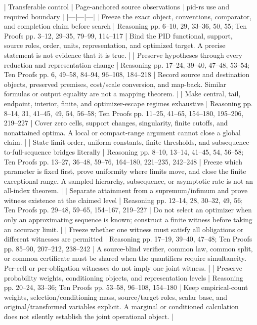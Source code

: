 \documentclass[11pt]{article}
\begin{document}
\begin{markdown}
| Transferable control | Page-anchored source observations | pid-rs use and required boundary |
|---|---|---|
| Freeze the exact object, conventions, comparator, and completion claim before search | Reasoning pp. 6--10, 29, 33--36, 50, 55; Ten Proofs pp. 3--12, 29--35, 79--99, 114--117 | Bind the PID functional, support, source roles, order, units, representation, and optimized target. A precise statement is not evidence that it is true. |
| Preserve hypotheses through every reduction and representation change | Reasoning pp. 17--24, 39--40, 47--48, 53--54; Ten Proofs pp. 6, 49--58, 84--94, 96--108, 184--218 | Record source and destination objects, preserved premises, cost/scale conversion, and map-back. Similar formulas or output equality are not a mapping theorem. |
| Make central, tail, endpoint, interior, finite, and optimizer-escape regimes exhaustive | Reasoning pp. 8--14, 31, 41--45, 49, 54, 56--58; Ten Proofs pp. 11--25, 41--65, 154--180, 195--206, 219--227 | Cover zero cells, support changes, singularity, finite cutoffs, and nonattained optima. A local or compact-range argument cannot close a global claim. |
| State limit order, uniform constants, finite thresholds, and subsequence-to-full-sequence bridges literally | Reasoning pp. 8--10, 13--14, 41--45, 54, 56--58; Ten Proofs pp. 13--27, 36--48, 59--76, 164--180, 221--235, 242--248 | Freeze which parameter is fixed first, prove uniformity where limits move, and close the finite exceptional range. A sampled hierarchy, subsequence, or asymptotic rate is not an all-index theorem. |
| Separate attainment from a supremum/infimum and prove witness existence at the claimed level | Reasoning pp. 12--14, 28, 30--32, 49, 56; Ten Proofs pp. 29--48, 59--65, 154--167, 219--227 | Do not select an optimizer when only an approximating sequence is known; construct a finite witness before taking an accuracy limit. |
| Freeze whether one witness must satisfy all obligations or different witnesses are permitted | Reasoning pp. 17--19, 39--40, 47--48; Ten Proofs pp. 85--90, 207--212, 238--242 | A source-blind verifier, common law, common split, or common certificate must be shared when the quantifiers require simultaneity. Per-cell or per-obligation witnesses do not imply one joint witness. |
| Preserve probability weights, conditioning objects, and representation levels | Reasoning pp. 20--24, 33--36; Ten Proofs pp. 53--58, 96--108, 154--180 | Keep empirical-count weights, selection/conditioning mass, source/target roles, scalar base, and original/transformed variables explicit. A marginal or conditioned calculation does not silently establish the joint operational object. |

\end{markdown}
\end{document}
